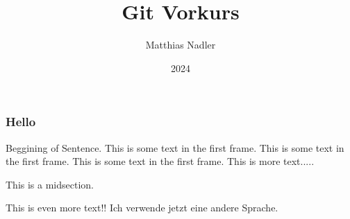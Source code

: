 \documentclass{beamer}
\title{Git Vorkurs}
\author{Matthias Nadler}
\institute{Uni Basel}
\date{2024}
\begin{document}
\frame{\titlepage}

\begin{frame}
\frametitle{Hello}
Beggining of Sentence. This is some text in the first frame. This is some text in the first frame. This is some text in the first frame.
This is more text.....

This is a midsection.

This is even more text!!
Ich verwende jetzt eine andere Sprache.

\end{frame}
\end{document}
